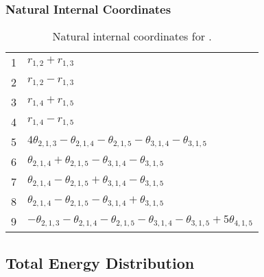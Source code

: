 \documentclass[10pt,oneside]{article}
\begin{document}
\begin{table}[h!]
\subsubsection*{Natural Internal Coordinates}
\centering
\caption{Natural internal coordinates for .}
\small
\begin{tabular}{ll}
\toprule
  1   & $r_{1,2} + r_{1,3}$ \\
  2   & $r_{1,2} - r_{1,3}$ \\
  3   & $r_{1,4} + r_{1,5}$ \\
  4   & $r_{1,4} - r_{1,5}$ \\
  5   & $4\theta_{2,1,3} - \theta_{2,1,4} - \theta_{2,1,5} - \theta_{3,1,4} - \theta_{3,1,5}$ \\
  6   & $\theta_{2,1,4} + \theta_{2,1,5} - \theta_{3,1,4} - \theta_{3,1,5}$ \\
  7   & $\theta_{2,1,4} - \theta_{2,1,5} + \theta_{3,1,4} - \theta_{3,1,5}$ \\
  8   & $\theta_{2,1,4} - \theta_{2,1,5} - \theta_{3,1,4} + \theta_{3,1,5}$ \\
  9   & $-\theta_{2,1,3} - \theta_{2,1,4} - \theta_{2,1,5} - \theta_{3,1,4} - \theta_{3,1,5} + 5\theta_{4,1,5}$ \\
\bottomrule
\end{tabular}
\end{table}

\begin{table}
\subsection*{Total Energy Distribution}
\centering\end{table}

\clearpage

\subsection{}
\end{document}
